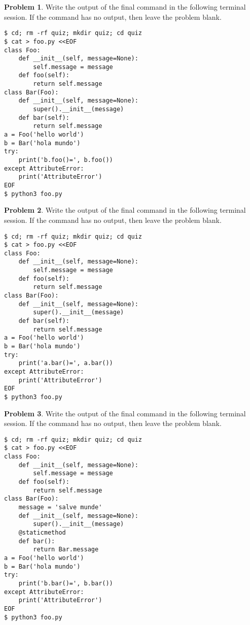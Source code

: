 \documentclass[10pt]{article}
\theoremstyle{definition}
\newtheorem{problem}{Problem}
\begin{document}
\filbreak
\begin{problem}
    Write the output of the final command in the following terminal session.
    If the command has no output, then leave the problem blank.
\end{problem}
\begin{lstlisting}
$ cd; rm -rf quiz; mkdir quiz; cd quiz
$ cat > foo.py <<EOF
class Foo:
    def __init__(self, message=None):
        self.message = message
    def foo(self):
        return self.message
class Bar(Foo):
    def __init__(self, message=None):
        super().__init__(message)
    def bar(self):
        return self.message
a = Foo('hello world')
b = Bar('hola mundo')
try:
    print('b.foo()=', b.foo())
except AttributeError:
    print('AttributeError') 
EOF
$ python3 foo.py
\end{lstlisting}


\filbreak
\begin{problem}
    Write the output of the final command in the following terminal session.
    If the command has no output, then leave the problem blank.
\end{problem}
\begin{lstlisting}
$ cd; rm -rf quiz; mkdir quiz; cd quiz
$ cat > foo.py <<EOF
class Foo:
    def __init__(self, message=None):
        self.message = message
    def foo(self):
        return self.message
class Bar(Foo):
    def __init__(self, message=None):
        super().__init__(message)
    def bar(self):
        return self.message
a = Foo('hello world')
b = Bar('hola mundo')
try:
    print('a.bar()=', a.bar())
except AttributeError:
    print('AttributeError') 
EOF
$ python3 foo.py
\end{lstlisting}


\filbreak
\begin{problem}
    Write the output of the final command in the following terminal session.
    If the command has no output, then leave the problem blank.
\end{problem}
\begin{lstlisting}
$ cd; rm -rf quiz; mkdir quiz; cd quiz
$ cat > foo.py <<EOF
class Foo:
    def __init__(self, message=None):
        self.message = message
    def foo(self):
        return self.message
class Bar(Foo):
    message = 'salve munde'
    def __init__(self, message=None):
        super().__init__(message)
    @staticmethod
    def bar():
        return Bar.message
a = Foo('hello world')
b = Bar('hola mundo')
try:
    print('b.bar()=', b.bar())
except AttributeError:
    print('AttributeError') 
EOF
$ python3 foo.py
\end{lstlisting}
\end{document}
